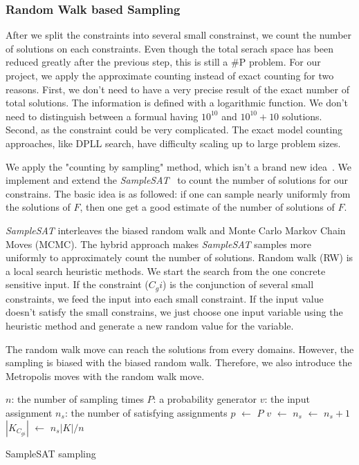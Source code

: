 \subsubsection{Random Walk based Sampling}

After we split the constraints into several small constrainst, we count
the number of solutions on each constraints. Even though the total serach
space has been reduced greatly after the previous step, this is still a
\#P problem. For our project, we apply the approximate counting instead of
exact counting for two reasons. First, we don't need to have a very precise
result of the exact number of total solutions. The information is defined with
a logarithmic function. We don't need to distinguish between a formual having
$10^{10}$ and $10^{10} + 10$ solutions.
Second, as the constraint could be very complicated. The exact model counting
approaches, like DPLL search, have difficulty scaling up to large problem sizes.

We apply the "counting by sampling" method, which isn't a brand new idea~\cite{10.1007/11499107_24,Wei2004TowardsES}. 
We implement and extend the \textit{SampleSAT}~\cite{10.1007/11499107_24} to count the number 
of solutions for our constrains. The basic idea is as followed: if
one can sample nearly uniformly from the solutions of $F$, then one
get a good estimate of the number of solutions of $F$. 

\textit{SampleSAT} interleaves
the biased random walk and Monte Carlo Markov Chain Moves (MCMC). The hybrid
approach makes \textit{SampleSAT} samples more uniformly to
approximately count the number of solutions. Random walk (RW) is a 
local search heuristic methods. We start the search from
the one concrete sensitive input. If the constraint ($C_gi$) is the conjunction
of several small constraints, we feed the input into each small constraint. If 
the input value doesn't satisfy the small constrains, we just choose one input 
variable using the heuristic method and generate a new random value for the variable.

The random walk move can reach the solutions from every domains.
However, the sampling is biased with the biased random walk. Therefore,
we also introduce the Metropolis moves with the random walk move.

\IncMargin{1em}
\begin{algorithm}
\SetAlgoLined
\DontPrintSemicolon


$n$: the number of sampling times \;
$P$: a probability generator \;
$v$: the input assignment \;
$n_{s}$: the number of satisfying assignments \;
 {
      $p$ $\leftarrow$ $P$ \;
      {
        $v$ $\leftarrow$  {}
      }
      {$n_{s}$ $\leftarrow$ $n_{s} + 1$}
}
$|K_{C_{gi}}|$ $\leftarrow$ $n_s|K| / n$
\caption{SampleSAT sampling}
\end{algorithm}
\DecMargin{1em}



